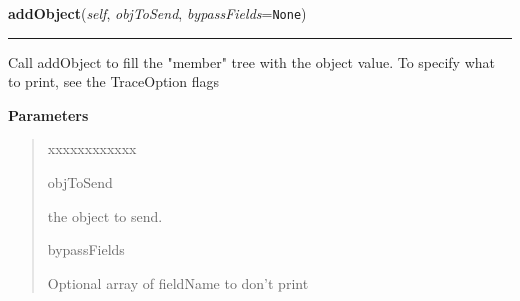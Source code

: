     \vspace{0.5ex}

\hspace{.8\funcindent}\begin{boxedminipage}{\funcwidth}

    \raggedright \textbf{addObject}(\textit{self}, \textit{objToSend}, \textit{bypassFields}={\tt None})

    \vspace{-1.5ex}

    \rule{\textwidth}{0.5\fboxrule}
\setlength{\parskip}{2ex}
    Call addObject to fill the "member" tree with the object value. To 
    specify what to print, see the TraceOption flags

\setlength{\parskip}{1ex}
      \textbf{Parameters}
      \vspace{-1ex}

      \begin{quote}
        \begin{Ventry}{xxxxxxxxxxxx}

          \item[objToSend]

          the object to send.

          \item[bypassFields]

          Optional array of fieldName to don't print

        \end{Ventry}

      \end{quote}

    \end{boxedminipage}

    \label{tracetool:TraceNodeEx:addValue}

    \vspace{0.5ex}


